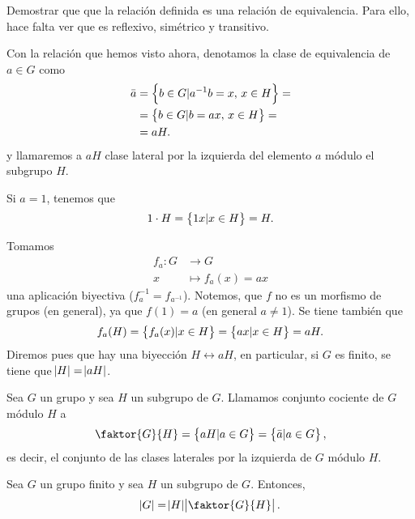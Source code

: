\begin{ej}
    Demostrar que que la relación definida es una relación de equivalencia. Para ello, hace falta ver que es
    reflexivo, simétrico y transitivo.
\end{ej}

\begin{defi}
    Con la relación que hemos visto ahora, denotamos la clase de equivalencia de $a \in G$ como
    \[
        \begin{aligned}
            \bar{a} &= \left\{b \in G \vert a^{-1}b = x, \, x \in H\right\} =\\ &=
            \left\{b \in G \vert b = ax, \, x \in H\right\} =\\&= aH.
        \end{aligned}
    \]
    y llamaremos a $aH$ clase lateral por la izquierda del elemento $a$ módulo el subgrupo $H$.
\end{defi}

\begin{example}
    Si $a = 1$, tenemos que
    \[
        1\cdot H = \left\{1x \vert x \in H\right\} = H.
    \]
\end{example}

\begin{obs}
    Tomamos
    \[
        \begin{aligned}
            f_a \colon G &\to G \\
            x &\mapsto f_a(x) = ax
        \end{aligned}
    \]
    una aplicación biyectiva ($f^{-1}_a = f_{a^{-1}}$). Notemos, que $f$ no es un morfismo
    de grupos (en general), ya que $f(1) = a$ (en general $a \neq 1$). Se tiene también que
    \[
        f_a(H) = \left\{f_a(x) \vert x \in H\right\} = \left\{ax \vert x \in H\right\} = aH.
    \]
    Diremos pues que hay una biyección $H \leftrightarrow aH$, en particular, si $G$ es finito, se tiene que
    $\abs{H} = \abs{aH}$.
\end{obs}

\begin{defi}
    Sea $G$ un grupo y sea $H$ un subgrupo de $G$. Llamamos conjunto cociente de $G$ módulo $H$ a 
    \[
        \faktor{G}{H} = \setb{aH \vert a \in G} = \setb{ \bar{a} \vert a \in G},
    \]
    es decir, el conjunto de las clases laterales por la izquierda de $G$ módulo $H$.
    
\end{defi}

\begin{teo}[de Lagrange]
    Sea $G$ un grupo finito y sea $H$ un subgrupo de $G$. Entonces,
    \[
        \abs{G} = \abs{H} \abs{\faktor{G}{H}}.
    \]
\end{teo}

